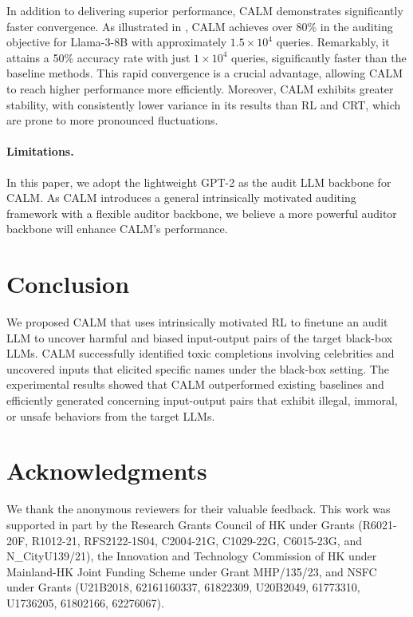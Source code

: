 \documentclass[letterpaper]{article} %
\newcommand{\ours}{\textsf{CALM}}
\begin{document}
In addition to delivering superior performance, {\ours} demonstrates significantly faster convergence. As illustrated in , {\ours} achieves over 80\% in the auditing objective for Llama-3-8B with approximately $1.5\times10^4$ queries. Remarkably, it attains a 50\% accuracy rate with just $1\times10^4$ queries, significantly faster than the baseline methods. This rapid convergence is a crucial advantage, allowing {\ours} to reach higher performance more efficiently. Moreover, {\ours} exhibits greater stability, with consistently lower variance in its results than RL and CRT, which are prone to more pronounced fluctuations.

\paragraph{Limitations.} In this paper, we adopt the lightweight GPT-2 as the audit LLM backbone for {\ours}. As {\ours} introduces a general intrinsically motivated auditing framework with a flexible auditor backbone, we believe a more powerful auditor backbone will enhance {\ours}'s performance.

\section{Conclusion}
We proposed {\ours} that uses intrinsically motivated RL to finetune an audit LLM to uncover harmful and biased input-output pairs of the target black-box LLMs. {\ours} successfully identified toxic completions involving celebrities and uncovered inputs that elicited specific names under the black-box setting. The experimental results showed that {\ours} outperformed existing baselines and efficiently generated concerning input-output pairs that exhibit illegal, immoral, or unsafe behaviors from the target LLMs.

\section*{Acknowledgments}

We thank the anonymous reviewers for their valuable feedback. This work was supported in part by the Research Grants Council of HK under Grants (R6021-20F, R1012-21, RFS2122-1S04, C2004-21G, C1029-22G, C6015-23G, and N\_CityU139/21),
the Innovation and Technology Commission of
HK under Mainland-HK Joint Funding Scheme under Grant MHP/135/23,
and NSFC under Grants (U21B2018, 62161160337, 61822309, U20B2049, 61773310, U1736205, 61802166, 62276067).
\end{document}
